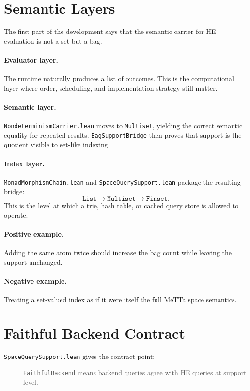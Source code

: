\documentclass[11pt]{article}
\newcommand{\code}[1]{\texttt{#1}}
\newcommand{\HE}{\textup{HE}}
\begin{document}
\section{Semantic Layers}

The first part of the development says that the semantic carrier for
\HE{} evaluation is not a set but a bag.

\paragraph{Evaluator layer.}
The runtime naturally produces a list of outcomes.  This is the
computational layer where order, scheduling, and implementation strategy
still matter.

\paragraph{Semantic layer.}
\code{NondeterminismCarrier.lean} moves to \code{Multiset}, yielding the
correct semantic equality for repeated results.  \code{BagSupportBridge}
then proves that support is the quotient visible to set-like indexing.

\paragraph{Index layer.}
\code{MonadMorphismChain.lean} and \code{SpaceQuerySupport.lean} package
the resulting bridge:
\[
\texttt{List} \to \texttt{Multiset} \to \texttt{Finset}.
\]
This is the level at which a trie, hash table, or cached query store is
allowed to operate.

\paragraph{Positive example.}
Adding the same atom twice should increase the bag count while leaving the
support unchanged.

\paragraph{Negative example.}
Treating a set-valued index as if it were itself the full MeTTa space
semantics.

\section{Faithful Backend Contract}

\code{SpaceQuerySupport.lean} gives the contract point:
\begin{quote}
\code{FaithfulBackend} means backend queries agree with \HE{} queries at
support level.
\end{quote}
\end{document}
